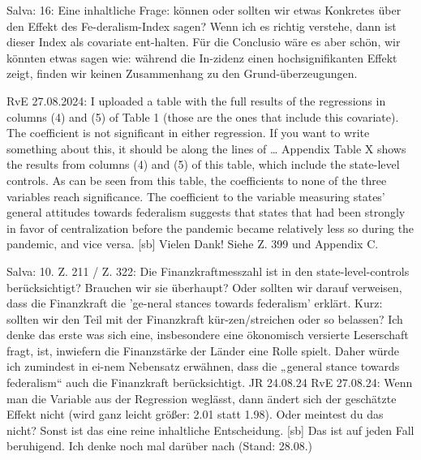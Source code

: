 Salva: 16: Eine inhaltliche Frage: können oder sollten wir etwas Konkretes über den Effekt des Fe-deralism-Index sagen? Wenn ich es richtig verstehe, dann ist dieser Index als covariate ent-halten. Für die Conclusio wäre es aber schön, wir könnten etwas sagen wie: während die In-zidenz einen hochsignifikanten Effekt zeigt, finden wir keinen Zusammenhang zu den Grund-überzeugungen.

RvE 27.08.2024: I uploaded a table with the full results of the regressions in columns (4) and (5) of Table 1 (those are the ones that include this covariate). The coefficient is not significant in either regression.
If you want to write something about this, it should be along the lines of
… Appendix Table X shows the results from columns (4) and (5) of this table, which include the state-level controls. As can be seen from this table, the coefficients to none of the three variables reach significance. The coefficient to the variable measuring states’ general attitudes towards federalism suggests that states that had been strongly in favor of centralization before the pandemic became relatively less so during the pandemic, and vice versa.
[sb] Vielen Dank! Siehe Z. 399 und Appendix C.

Salva: 10. Z. 211 / Z. 322: Die Finanzkraftmesszahl ist in den state-level-controls berücksichtigt? Brauchen wir sie überhaupt? Oder sollten wir darauf verweisen, dass die Finanzkraft die 'ge-neral stances towards federalism' erklärt. Kurz: sollten wir den Teil mit der Finanzkraft kür-zen/streichen oder so belassen?
Ich denke das erste was sich eine, insbesondere eine ökonomisch versierte Leserschaft fragt, ist, inwiefern die Finanzstärke der Länder eine Rolle spielt. Daher würde ich zumindest in ei-nem Nebensatz erwähnen, dass die „general stance towards federalism“ auch die Finanzkraft berücksichtigt. JR 24.08.24
RvE 27.08.24: Wenn man die Variable aus der Regression weglässt, dann ändert sich der geschätzte Effekt nicht (wird ganz leicht größer: 2.01 statt 1.98). Oder meintest du das nicht? Sonst ist das eine reine inhaltliche Entscheidung.
[sb] Das ist auf jeden Fall beruhigend. Ich denke noch mal darüber nach (Stand: 28.08.)
